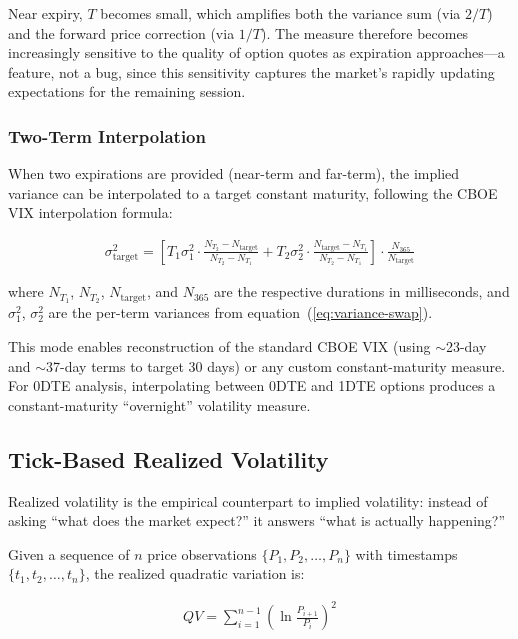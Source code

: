 \documentclass[11pt, a4paper]{article}
\begin{document}
Near expiry, $T$ becomes small, which amplifies both the variance sum (via $2/T$) and the forward price correction (via $1/T$). The measure therefore becomes increasingly sensitive to the quality of option quotes as expiration approaches---a feature, not a bug, since this sensitivity captures the market's rapidly updating expectations for the remaining session.

\subsubsection{Two-Term Interpolation}

When two expirations are provided (near-term and far-term), the implied variance can be interpolated to a target constant maturity, following the CBOE VIX interpolation formula:

\begin{align}
\sigma_{\text{target}}^2 = \left[T_1 \sigma_1^2 \cdot \frac{N_{T_2} - N_{\text{target}}}{N_{T_2} - N_{T_1}} + T_2 \sigma_2^2 \cdot \frac{N_{\text{target}} - N_{T_1}}{N_{T_2} - N_{T_1}}\right] \cdot \frac{N_{365}}{N_{\text{target}}}
\end{align}

where $N_{T_1}$, $N_{T_2}$, $N_{\text{target}}$, and $N_{365}$ are the respective durations in milliseconds, and $\sigma_1^2$, $\sigma_2^2$ are the per-term variances from equation~(\ref{eq:variance-swap}).

This mode enables reconstruction of the standard CBOE VIX (using $\sim$23-day and $\sim$37-day terms to target 30 days) or any custom constant-maturity measure. For 0DTE analysis, interpolating between 0DTE and 1DTE options produces a constant-maturity ``overnight'' volatility measure.

\subsection{Tick-Based Realized Volatility}
\label{subsec:realized-vol}

Realized volatility is the empirical counterpart to implied volatility: instead of asking ``what does the market expect?'' it answers ``what is actually happening?''

Given a sequence of $n$ price observations $\{P_1, P_2, \ldots, P_n\}$ with timestamps $\{t_1, t_2, \ldots, t_n\}$, the realized quadratic variation is:

\begin{align}
QV = \sum_{i=1}^{n-1} \left(\ln\frac{P_{i+1}}{P_i}\right)^2
\end{align}
\end{document}
